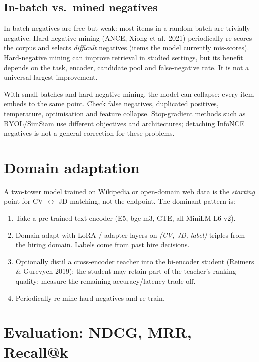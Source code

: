 \documentclass[11pt,oneside]{scrbook}
\begin{document}
\subsection{In-batch vs.\ mined negatives}

In-batch negatives are free but weak: most items in a random batch are
trivially negative. Hard-negative mining (ANCE, Xiong et al.\ 2021) periodically
re-scores the corpus and selects \emph{difficult} negatives (items the model
currently mis-scores). Hard-negative mining can improve retrieval in studied settings, but
its benefit depends on the task, encoder, candidate pool and false-negative
rate. It is not a universal largest improvement.

\begin{pitfall}
With small batches and hard-negative mining, the model can collapse: every
item embeds to the same point. Check false negatives, duplicated positives, temperature, optimisation
and feature collapse. Stop-gradient methods such as BYOL/SimSiam use
different objectives and architectures; detaching InfoNCE negatives is not
a general correction for these problems.
\end{pitfall}

\section{Domain adaptation}

A two-tower model trained on Wikipedia or open-domain web data is the
\emph{starting} point for CV $\leftrightarrow$ JD matching, not the
endpoint. The dominant pattern is:
\begin{enumerate}\setlength\itemsep{2pt}
  \item Take a pre-trained text encoder (E5, bge-m3, GTE, all-MiniLM-L6-v2).
  \item Domain-adapt with LoRA / adapter layers on \emph{(CV, JD, label)}
        triples from the hiring domain. Labels come from past hire decisions.
  \item Optionally distil a cross-encoder teacher into the bi-encoder
        student (Reimers \& Gurevych 2019); the student may retain part of the teacher's ranking quality;
measure the remaining accuracy/latency trade-off.
  \item Periodically re-mine hard negatives and re-train.
\end{enumerate}

\section{Evaluation: NDCG, MRR, Recall@k}
\end{document}
